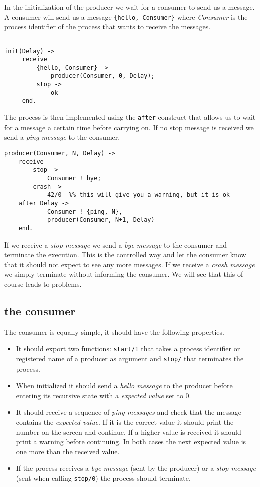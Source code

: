 \documentclass[a4paper, 11pt]{article}
\begin{document}
In the initialization of the producer we wait for a consumer to send
us a message. A consumer will send us a message {\tt \{hello,
  Consumer\}} where {\em Consumer} is the process identifier of the
process that wants to receive the messages.

\begin{verbatim}

init(Delay) ->
     receive 
         {hello, Consumer} ->
             producer(Consumer, 0, Delay);
         stop ->
             ok
     end.
\end{verbatim}

The process is then implemented using the {\tt after} construct that
allows us to wait for a message a certain time before carrying on. If
no stop message is received we send a {\em ping message} to the consumer.

\begin{verbatim}
producer(Consumer, N, Delay) ->
    receive 
        stop -> 
            Consumer ! bye;
        crash ->
            42/0  %% this will give you a warning, but it is ok
    after Delay ->
            Consumer ! {ping, N},
            producer(Consumer, N+1, Delay)
    end.

\end{verbatim}

If we receive a {\em stop message} we send a {\em bye message} to the
consumer and terminate the execution. This is the controlled way and
let the consumer know that it should not expect to see any more
messages. If we receive a {\em crash message} we simply terminate
without informing the consumer. We will see that this of course leads
to problems.

\subsection{the consumer}

The consumer is equally simple, it should have the following properties.

\begin{itemize}
\item It should export two functions: {\tt start/1} that takes a
  process identifier or registered name of a producer as argument and
  {\tt stop/} that terminates the process.

\item When initialized it should send a {\em hello message} to the
  producer before entering its recursive state with a {\em expected value} set to 0.

\item It should receive a sequence of {\em ping messages} and check
  that the message contains the {\em expected value}. If it is the
  correct value it should print the number on the screen and
  continue. If a higher value is received it should print a warning
  before continuing. In both cases the next expected value is one more
  than the received value.

\item If the process receives a {\em bye message} (sent by the
  producer) or a {\em stop message} (sent when calling {\tt stop/0})
  the process should terminate.
\end{itemize}
\end{document}
